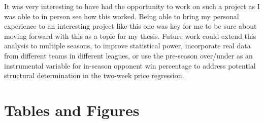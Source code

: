 \documentclass[12pt]{article}
\begin{document}
It was very interesting to have had the opportunity to work on such a project as I was able to in person see how this worked. Being able to bring my personal experience to an interesting project like this one was key for me to be sure about moving forward with this as a topic for my thesis. Future work could extend this analysis to multiple seasons, to improve statistical power, incorporate real data from different teams in different leagues, or use the pre-season over/under as an instrumental variable for in-season opponent win percentage to address potential structural determination in the two-week price regression.
 
 
\newpage
 
 
\newpage
\appendix
\section*{Tables and Figures}
 
\end{document}
